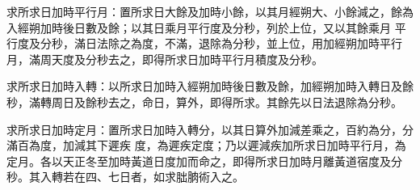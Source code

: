 \begin{pinyinscope}
 求所求日加時平行月：置所求日大餘及加時小餘，以其月經朔大、小餘減之，餘為入經朔加時後日數及餘；以其日乘月平行度及分秒，列於上位，又以其餘乘月
 平行度及分秒，滿日法除之為度，不滿，退除為分秒，並上位，用加經朔加時平行月，滿周天度及分秒去之，即得所求日加時平行月積度及分秒。



 求所求日加時入轉：以所求日加時入經朔加時後日數及餘，加經朔加時入轉日及餘秒，滿轉周日及餘秒去之，命日，算外，即得所求。其餘先以日法退除為分秒。



 求所求日加時定月：置所求日加時入轉分，以其日算外加減差乘之，百約為分，分滿百為度，加減其下遲疾
 度，為遲疾定度；乃以遲減疾加所求日加時平行月，為定月。各以天正冬至加時黃道日度加而命之，即得所求日加時月離黃道宿度及分秒。其入轉若在四、七日者，如求朏朒術入之。



\end{pinyinscope}